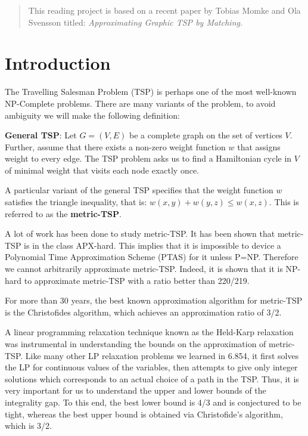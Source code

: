 \documentclass[12pt]{article}
\begin{document}
\maketitle

\begin{abstract}
This reading project is based on a recent paper by Tobias Momke and Ola Svensson titled: \emph{Approximating Graphic TSP by Matching}.
\end{abstract}


\section{Introduction}
The Travelling Salesman Problem (TSP) is perhaps one of the most well-known NP-Complete problems. There are many variants of the problem, to avoid ambiguity we will make the following definition:

{\bf General TSP}: Let $G = (V,E)$ be a complete graph on the set of vertices $V$. Further, assume that there exists a non-zero weight function $w$ that assigns weight to every edge. The TSP problem asks us to find a Hamiltonian cycle in $V$ of minimal weight that visits each node exactly once.

A particular variant of the general TSP specifies that the weight function $w$ satisfies the triangle inequality, that is: $w(x,y)+w(y,z) \leq w(x,z)$. This is referred to as the {\bf metric-TSP}.

A lot of work has been done to study metric-TSP. It has been shown that metric-TSP is in the class APX-hard. This implies that it is impossible to device a Polynomial Time Approximation Scheme (PTAS) for it unless P=NP. Therefore we cannot arbitrarily approximate metric-TSP. Indeed, it is shown that it is NP-hard to approximate metric-TSP with a ratio better than 220/219.

For more than 30 years, the best known approximation algorithm for metric-TSP is the Christofides algorithm, which achieves an approximation ratio of 3/2.

A linear programming relaxation technique known as the Held-Karp relaxation was instrumental in understanding the bounds on the approximation of metric-TSP. Like many other LP relaxation problems we learned in 6.854, it first solves the LP for continuous values of the variables, then attempts to give only integer solutions which corresponds to an actual choice of a path in the TSP. Thus, it is very important for us to understand the upper and lower bounds of the integrality gap. To this end, the best lower bound is 4/3 and is conjectured to be tight, whereas the best upper bound is obtained via Christofide's algorithm, which is 3/2.
\end{document}
